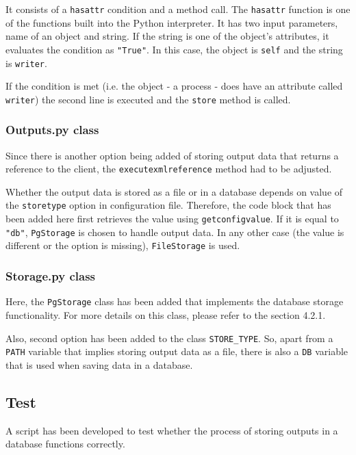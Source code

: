 It consists of a \texttt{hasattr} condition and a method call. The \texttt{hasattr} function is one of the functions built into the Python interpreter. It has two input parameters, name of an object and string. If the string is one of the object's attributes, it evaluates the condition as \texttt{"True"}. \cite{hasattr} In this case, the object is \texttt{self} and the string is \texttt{writer}. 

If the condition is met (i.e. the object - a process - does have an attribute called \texttt{writer}) the second line is executed and the \texttt{store} method is called.

\subsubsection{Outputs.py class}

Since there is another option being added of storing output data that returns a reference to the client, the \texttt{\textunderscore execute\textunderscore xml\textunderscore reference} method had to be adjusted.

Whether the output data is stored as a file or in a database depends on value of the \texttt{store\textunderscore type} option in configuration file. Therefore, the code block that has been added here first retrieves the value using \texttt{get\textunderscore config\textunderscore value}. If it is equal to \texttt{"db"}, \texttt{PgStorage} is chosen to handle output data. In any other case (the value is different or the option is missing), \texttt{FileStorage} is used.

\subsubsection{Storage.py class}

Here, the \texttt{PgStorage} class has been added that implements the database storage functionality. For more details on this class, please refer to the section 4.2.1.

Also, second option has been added to the class \texttt{STORE_TYPE}. So, apart from a \texttt{PATH} variable that implies storing output data as a file, there is also a \texttt{DB} variable that is used when saving data in a database.

\subsection{Test} 

A script has been developed to test whether the process of storing outputs in a database functions correctly.

